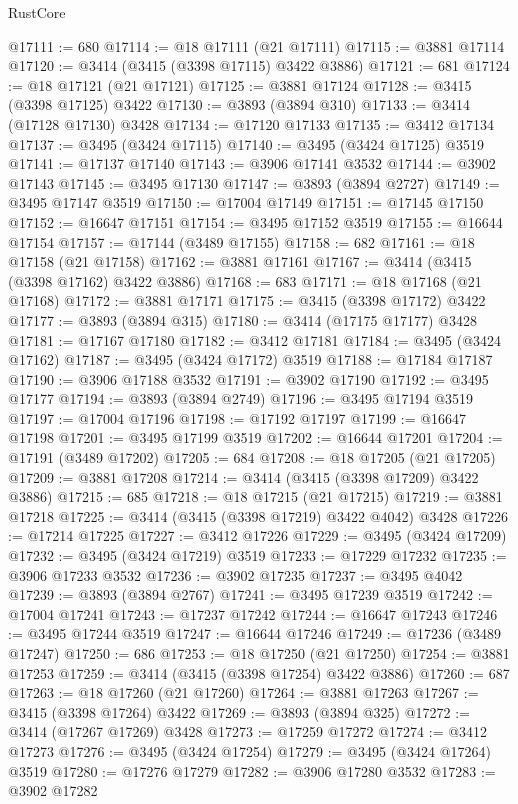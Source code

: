 \begin{lexlean}{RustCore}
\begin{coremodule}
@17111 := 680
@17114 := @18 @17111 (@21 @17111)
@17115 := @3881 @17114
@17120 := @3414 (@3415 (@3398 @17115) @3422 @3886)
@17121 := 681
@17124 := @18 @17121 (@21 @17121)
@17125 := @3881 @17124
@17128 := @3415 (@3398 @17125) @3422
@17130 := @3893 (@3894 @310)
@17133 := @3414 (@17128 @17130) @3428
@17134 := @17120 @17133
@17135 := @3412 @17134
@17137 := @3495 (@3424 @17115)
@17140 := @3495 (@3424 @17125) @3519
@17141 := @17137 @17140
@17143 := @3906 @17141 @3532
@17144 := @3902 @17143
@17145 := @3495 @17130
@17147 := @3893 (@3894 @2727)
@17149 := @3495 @17147 @3519
@17150 := @17004 @17149
@17151 := @17145 @17150
@17152 := @16647 @17151
@17154 := @3495 @17152 @3519
@17155 := @16644 @17154
@17157 := @17144 (@3489 @17155)
@17158 := 682
@17161 := @18 @17158 (@21 @17158)
@17162 := @3881 @17161
@17167 := @3414 (@3415 (@3398 @17162) @3422 @3886)
@17168 := 683
@17171 := @18 @17168 (@21 @17168)
@17172 := @3881 @17171
@17175 := @3415 (@3398 @17172) @3422
@17177 := @3893 (@3894 @315)
@17180 := @3414 (@17175 @17177) @3428
@17181 := @17167 @17180
@17182 := @3412 @17181
@17184 := @3495 (@3424 @17162)
@17187 := @3495 (@3424 @17172) @3519
@17188 := @17184 @17187
@17190 := @3906 @17188 @3532
@17191 := @3902 @17190
@17192 := @3495 @17177
@17194 := @3893 (@3894 @2749)
@17196 := @3495 @17194 @3519
@17197 := @17004 @17196
@17198 := @17192 @17197
@17199 := @16647 @17198
@17201 := @3495 @17199 @3519
@17202 := @16644 @17201
@17204 := @17191 (@3489 @17202)
@17205 := 684
@17208 := @18 @17205 (@21 @17205)
@17209 := @3881 @17208
@17214 := @3414 (@3415 (@3398 @17209) @3422 @3886)
@17215 := 685
@17218 := @18 @17215 (@21 @17215)
@17219 := @3881 @17218
@17225 := @3414 (@3415 (@3398 @17219) @3422 @4042) @3428
@17226 := @17214 @17225
@17227 := @3412 @17226
@17229 := @3495 (@3424 @17209)
@17232 := @3495 (@3424 @17219) @3519
@17233 := @17229 @17232
@17235 := @3906 @17233 @3532
@17236 := @3902 @17235
@17237 := @3495 @4042
@17239 := @3893 (@3894 @2767)
@17241 := @3495 @17239 @3519
@17242 := @17004 @17241
@17243 := @17237 @17242
@17244 := @16647 @17243
@17246 := @3495 @17244 @3519
@17247 := @16644 @17246
@17249 := @17236 (@3489 @17247)
@17250 := 686
@17253 := @18 @17250 (@21 @17250)
@17254 := @3881 @17253
@17259 := @3414 (@3415 (@3398 @17254) @3422 @3886)
@17260 := 687
@17263 := @18 @17260 (@21 @17260)
@17264 := @3881 @17263
@17267 := @3415 (@3398 @17264) @3422
@17269 := @3893 (@3894 @325)
@17272 := @3414 (@17267 @17269) @3428
@17273 := @17259 @17272
@17274 := @3412 @17273
@17276 := @3495 (@3424 @17254)
@17279 := @3495 (@3424 @17264) @3519
@17280 := @17276 @17279
@17282 := @3906 @17280 @3532
@17283 := @3902 @17282

\end{coremodule}
\end{lexlean}
